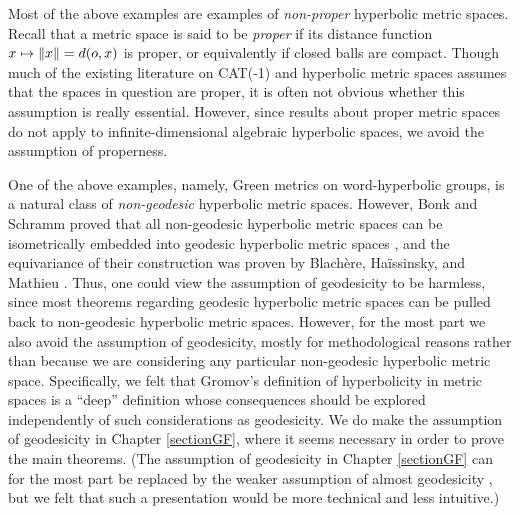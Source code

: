 \begin{remark}
\label{remarkproper}
Most of the above examples are examples of \emph{non-proper} hyperbolic metric spaces. Recall that a metric space is said to be \emph{proper} if its distance function $x\mapsto \|x\| = d(o,x)$ is proper, or equivalently if closed balls are compact. Though much of the existing literature on CAT(-1) and hyperbolic metric spaces assumes that the spaces in question are proper, it is often not obvious whether this assumption is really essential. However, since results about proper metric spaces do not apply to infinite-dimensional algebraic hyperbolic spaces, we avoid the assumption of properness.
\end{remark}

\begin{remark}
\label{remarkgeodesic}
One of the above examples, namely, Green metrics on word-hyperbolic groups, is a natural class of \emph{non-geodesic} hyperbolic metric spaces. However, Bonk and Schramm proved that all non-geodesic hyperbolic metric spaces can be isometrically embedded into geodesic hyperbolic metric spaces \cite[Theorem 4.1]{BonkSchramm}, and the equivariance of their construction was proven by Blach\`ere, Ha\"issinsky, and Mathieu \cite[Corollary A.10]{BHM}. Thus, one could view the assumption of geodesicity to be harmless, since most theorems regarding geodesic hyperbolic metric spaces can be pulled back to non-geodesic hyperbolic metric spaces. However, for the most part we also avoid the assumption of geodesicity, mostly for methodological reasons rather than because we are considering any particular non-geodesic hyperbolic metric space. Specifically, we felt that Gromov's definition of hyperbolicity in metric spaces is a ``deep'' definition whose consequences should be explored independently of such considerations as geodesicity. We do make the assumption of geodesicity in Chapter \ref{sectionGF}, where it seems necessary in order to prove the main theorems. (The assumption of geodesicity in Chapter \ref{sectionGF} can for the most part be replaced by the weaker assumption of almost geodesicity \cite[p.271]{BonkSchramm}, but we felt that such a presentation would be more technical and less intuitive.)
\end{remark}

